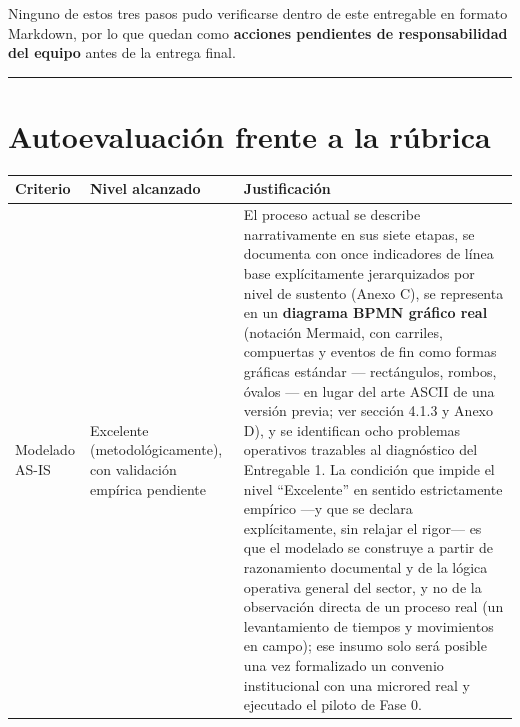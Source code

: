 \documentclass[11pt,a4paper]{article}
\begin{document}
Ninguno de estos tres pasos pudo verificarse dentro de este entregable en formato Markdown, por lo que quedan como \textbf{acciones pendientes de responsabilidad del equipo} antes de la entrega final.

\begin{center}\rule{0.5\linewidth}{0.5pt}\end{center}

\section{Autoevaluación frente a la rúbrica}\label{autoevaluaciuxf3n-frente-a-la-ruxfabrica}

{\small
\begin{longtable}[]{@{}
  >{\raggedright\arraybackslash}p{}
  >{\raggedright\arraybackslash}p{}
  >{\raggedright\arraybackslash}p{}@{}}
\toprule\noalign{}
\begin{minipage}[b]{\linewidth}\raggedright
Criterio
\end{minipage} & \begin{minipage}[b]{\linewidth}\raggedright
Nivel alcanzado
\end{minipage} & \begin{minipage}[b]{\linewidth}\raggedright
Justificación
\end{minipage} \\
\midrule\noalign{}
\endhead
\bottomrule\noalign{}
\endlastfoot
Modelado AS-IS & Excelente (metodológicamente), con validación empírica pendiente & El proceso actual se describe narrativamente en sus siete etapas, se documenta con once indicadores de línea base explícitamente jerarquizados por nivel de sustento (Anexo C), se representa en un \textbf{diagrama BPMN gráfico real} (notación Mermaid, con carriles, compuertas y eventos de fin como formas gráficas estándar --- rectángulos, rombos, óvalos --- en lugar del arte ASCII de una versión previa; ver sección 4.1.3 y Anexo D), y se identifican ocho problemas operativos trazables al diagnóstico del Entregable 1. La condición que impide el nivel ``Excelente'' en sentido estrictamente empírico ---y que se declara explícitamente, sin relajar el rigor--- es que el modelado se construye a partir de razonamiento documental y de la lógica operativa general del sector, y no de la observación directa de un proceso real (un levantamiento de tiempos y movimientos en campo); ese insumo solo será posible una vez formalizado un convenio institucional con una microred real y ejecutado el piloto de Fase 0. \\

\end{longtable}}
\end{document}

